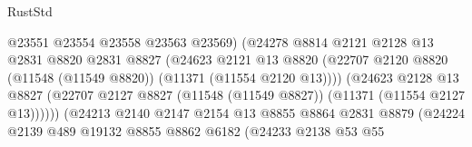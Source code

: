 \begin{lexlean}{RustStd}
\begin{coremodule}
                                          @23551
                                          @23554
                                          @23558
                                          @23563
                                          @23569)
                                        (@24278
                                          @8814
                                          @2121
                                          @2128
                                          @13
                                          @2831
                                          @8820
                                          @2831
                                          @8827
                                          (@24623
                                            @2121
                                            @13
                                            @8820
                                            (@22707
                                              @2120
                                              @8820
                                              (@11548 (@11549 @8820))
                                              (@11371 (@11554 @2120 @13))))
                                          (@24623
                                            @2128
                                            @13
                                            @8827
                                            (@22707
                                              @2127
                                              @8827
                                              (@11548 (@11549 @8827))
                                              (@11371 (@11554 @2127 @13))))))
                                      (@24213
                                        @2140
                                        @2147
                                        @2154
                                        @13
                                        @8855
                                        @8864
                                        @2831
                                        @8879
                                        (@24224
                                          @2139
                                          @489
                                          @19132
                                          @8855
                                          @8862
                                          @6182
                                          (@24233
                                            @2138
                                            @53
                                            @55

\end{coremodule}
\end{lexlean}
